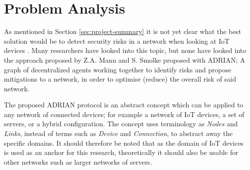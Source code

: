 \section{Problem Analysis}
\label{sec:problem-analysis}



As mentioned in Section \ref{sec:project-summary} it is not yet clear what the best solution would be to detect security risks in a network when looking at IoT devices \cite{zarpelao2017survey}. Many researchers have looked into this topic, but none have looked into the approach proposed by Z.A. Mann and S. Smolke proposed with ADRIAN; A graph of decentralized agents working together to identify risks and propose mitigations to a network, in order to optimise (reduce) the overall risk of said network.

The proposed ADRIAN protocol is an abstract concept which can be applied to any network of connected devices; for example a network of IoT devices, a set of servers, or a hybrid configuration. The concept uses terminology as \emph{Nodes} and \emph{Links}, instead of terms such as \emph{Device} and \emph{Connection}, to abstract away the specific domains. It should therefore be noted that as the domain of IoT devices is used as an anchor for this research, theoretically it should also be usable for other networks such as larger networks of servers. 



